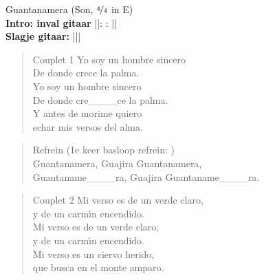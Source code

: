 \begin{song}{Guantanamera}
(Son, $\nicefrac{4}{4}$ in E)\\
\textbf{Intro: inval gitaar}
||:  : ||\\
\textbf{Slagje gitaar:}
|\hspace{1em}\hspace{1em}|\hspace{2em}|\\

\begin{verse}{Couplet 1}
  \hspace{1em} Yo soy un hombre sincero
  \\
  \hspace{1em} De donde crece la palma.
  \\
  \hspace{1em} Yo soy un hombre sincero
  \\
  De donde cre\_\_\_\_ce la palma.
  \\
  Y antes de morime quiero
  \\
  echar mis versos del alma.
\end{verse}

\begin{verse}{Refrein}
  (1e keer basloop refrein: )\\
  Guantanamera, \hspace{1em} Guajira Guantanamera,\hspace{1em} 
  \\
  Guantaname\_\_\_\_ra, Guajira Guantaname\_\_\_\_ra.
\end{verse}

\begin{verse}{Couplet 2}
  \hspace{1em} Mi verso es de un verde claro,\\
  \hspace{1em} y de un carm\'{\i}n encendido. \\
  \hspace{1em} Mi verso es de un verde claro, \\
  y de un carm\'{\i}n encendido.  \\
  Mi verso es un ciervo herido, \hspace{1em}  \\
  que busca en el monte amparo. \hspace{1em}
\end{verse}


\end{song}
